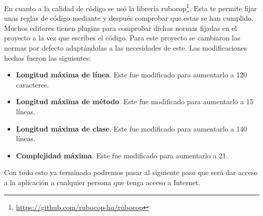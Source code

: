 En cuanto a la calidad de código se usó la librería rubocop\footnote{\url{https://github.com/rubocop-hq/rubocop}}. Esta te permite
fijar unas reglas de código mediante y después comprobar que estas se han cumplido.
Muchos editores tienen plugins para comprobar dichas normas fijadas en el proyecto
a la vez que escribes el código. Para este proyecto se cambiaron las normas por defecto
adaptándolas a las necesidades de este. Las modificaciones hechas fueron las siguientes:

\begin{itemize}
  \item \textbf{Longitud máxima de línea}. Este fue modificado para aumentarlo a 120 caracteres.
  \item \textbf{Longitud máxima de método}. Este fue modificado para aumentarlo a 15 líneas.
  \item \textbf{Longitud máxima de clase}. Este fue modificado para aumentarlo a 140 líneas.
  \item \textbf{Complejidad máxima}. Este fue modificado para aumentarlo a 21.
\end{itemize}

Con todo esto ya terminado podremos pasar al siguiente paso que será
dar acceso a la aplicación a cualquier persona que tenga acceso a Internet.
